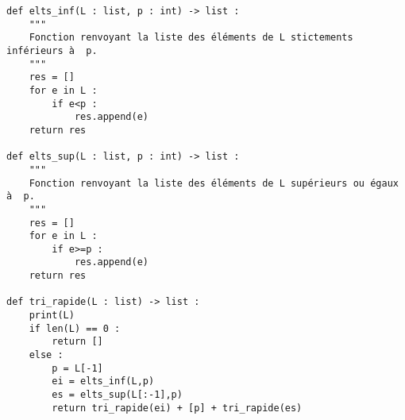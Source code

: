 \begin{lstlisting}
def elts_inf(L : list, p : int) -> list :
    """
    Fonction renvoyant la liste des éléments de L stictements inférieurs à  p.
    """
    res = []
    for e in L :
        if e<p :
            res.append(e)
    return res
    
def elts_sup(L : list, p : int) -> list :
    """
    Fonction renvoyant la liste des éléments de L supérieurs ou égaux à  p.
    """
    res = []
    for e in L :
        if e>=p :
            res.append(e)
    return res

def tri_rapide(L : list) -> list :
    print(L)
    if len(L) == 0 :
        return []
    else : 
        p = L[-1]
        ei = elts_inf(L,p)
        es = elts_sup(L[:-1],p)
        return tri_rapide(ei) + [p] + tri_rapide(es)
\end{lstlisting}

%
%
%
%
%
%		
%
%
%
%
%

